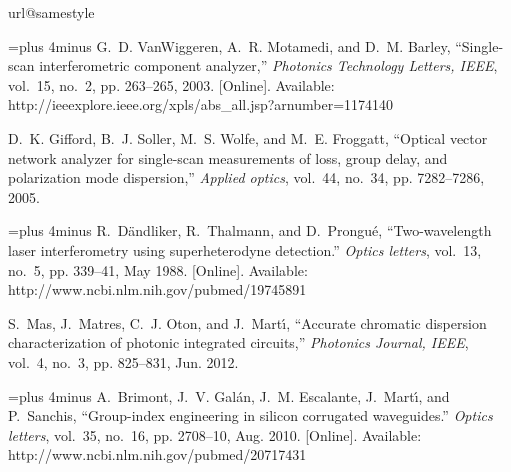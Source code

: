 \documentclass[journal]{IEEEtran}
\begin{document}
\begin{thebibliography}{10}
\providecommand{\url}[1]{#1}
\csname url@samestyle\endcsname
\providecommand{\newblock}{\relax}
\providecommand{\bibinfo}[2]{#2}
\providecommand{\BIBentrySTDinterwordspacing}{\spaceskip=0pt\relax}
\providecommand{\BIBentryALTinterwordstretchfactor}{4}
\providecommand{\BIBentryALTinterwordspacing}{\spaceskip=\fontdimen2\font plus
\BIBentryALTinterwordstretchfactor\fontdimen3\font minus
  \fontdimen4\font\relax}
\providecommand{\BIBforeignlanguage}[2]{{%
\expandafter\ifx\csname l@#1\endcsname\relax
\typeout{** WARNING: IEEEtran.bst: No hyphenation pattern has been}%
\typeout{** loaded for the language `#1'. Using the pattern for}%
\typeout{** the default language instead.}%
\else
\language=\csname l@#1\endcsname
\fi
#2}}
\providecommand{\BIBdecl}{\relax}
\BIBdecl

\BIBentryALTinterwordspacing
G.~D. VanWiggeren, A.~R. Motamedi, and D.~M. Barley, ``{Single-scan
  interferometric component analyzer},'' \emph{Photonics Technology Letters,
  IEEE}, vol.~15, no.~2, pp. 263--265, 2003. [Online]. Available:
  \url{http://ieeexplore.ieee.org/xpls/abs\_all.jsp?arnumber=1174140}
\BIBentrySTDinterwordspacing

D.~K. Gifford, B.~J. Soller, M.~S. Wolfe, and M.~E. Froggatt, ``{Optical vector
  network analyzer for single-scan measurements of loss, group delay, and
  polarization mode dispersion},'' \emph{Applied optics}, vol.~44, no.~34, pp.
  7282--7286, 2005.

\BIBentryALTinterwordspacing
R.~D\"{a}ndliker, R.~Thalmann, and D.~Prongu\'{e}, ``{Two-wavelength laser
  interferometry using superheterodyne detection.}'' \emph{Optics letters},
  vol.~13, no.~5, pp. 339--41, May 1988. [Online]. Available:
  \url{http://www.ncbi.nlm.nih.gov/pubmed/19745891}
\BIBentrySTDinterwordspacing

S.~Mas, J.~Matres, C.~J. Oton, and J.~Mart\'{\i}, ``{Accurate chromatic
  dispersion characterization of photonic integrated circuits},''
  \emph{Photonics Journal, IEEE}, vol.~4, no.~3, pp. 825--831, Jun. 2012.

\BIBentryALTinterwordspacing
A.~Brimont, J.~V. Gal\'{a}n, J.~M. Escalante, J.~Mart\'{\i}, and P.~Sanchis,
  ``{Group-index engineering in silicon corrugated waveguides.}'' \emph{Optics
  letters}, vol.~35, no.~16, pp. 2708--10, Aug. 2010. [Online]. Available:
  \url{http://www.ncbi.nlm.nih.gov/pubmed/20717431}
\BIBentrySTDinterwordspacing


\end{thebibliography}
\end{document}

